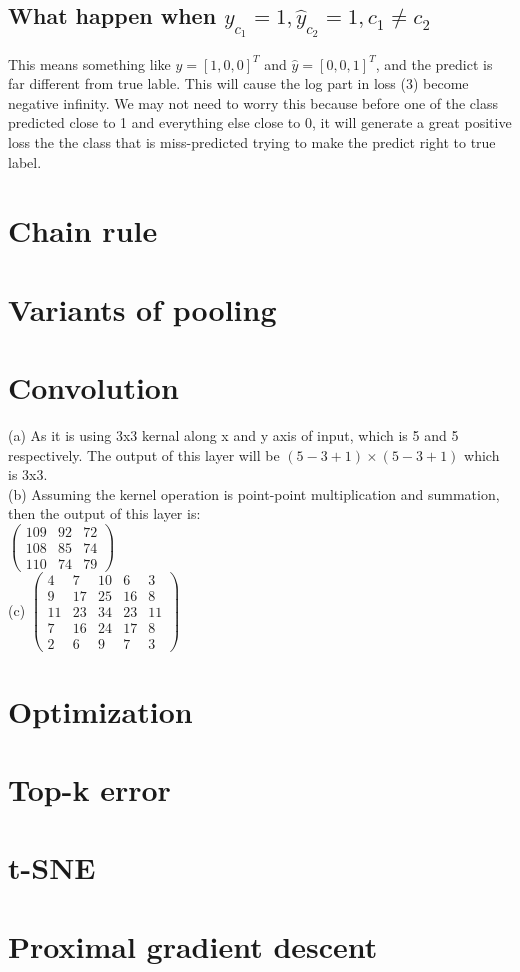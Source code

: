 \documentclass{article}
\begin{document}
\subsection{What happen when $y_{c_1}=1, \hat{y}_{c_2}=1, c_1 \neq c_2$}
This means something like $y = [1, 0, 0]^T$ and $\hat{y} = [0,0,1]^T$, and the predict is far different from true lable. This will cause the log part in loss (3) become negative infinity. We may not need to worry this because before one of the class predicted close to 1 and everything else close to 0, it will generate a great positive loss the the class that is miss-predicted trying to make the predict right to true label.
\section{Chain rule}
\section{Variants of pooling}
\section{Convolution}
(a) As it is using 3x3 kernal along x and y axis of input, which is 5 and 5 respectively. The output of this layer will be $(5-3+1)\times(5-3+1)$ which is 3x3.\\
(b) Assuming the kernel operation is point-point multiplication and summation, then the output of this layer is:\\
$\begin{pmatrix}
  109 & 92 & 72 \\[0.4em]
  108 & 85 & 74 \\[0.4em]
  110 & 74 & 79
\end{pmatrix}$ \\
(c)
$\begin{pmatrix}
  4 & 7 & 10 & 6 & 3 \\[0.4em]
  9 & 17 & 25 & 16 & 8 \\[0.4em]
  11 & 23 & 34 & 23 & 11 \\[0.4em]
  7 & 16 & 24 & 17 & 8 \\[0.4em]
  2 & 6 & 9 &7 & 3
\end{pmatrix}$ \\


\section{Optimization}
\section{Top-k error}
\section{t-SNE}
\section{Proximal gradient descent}
\end{document}
